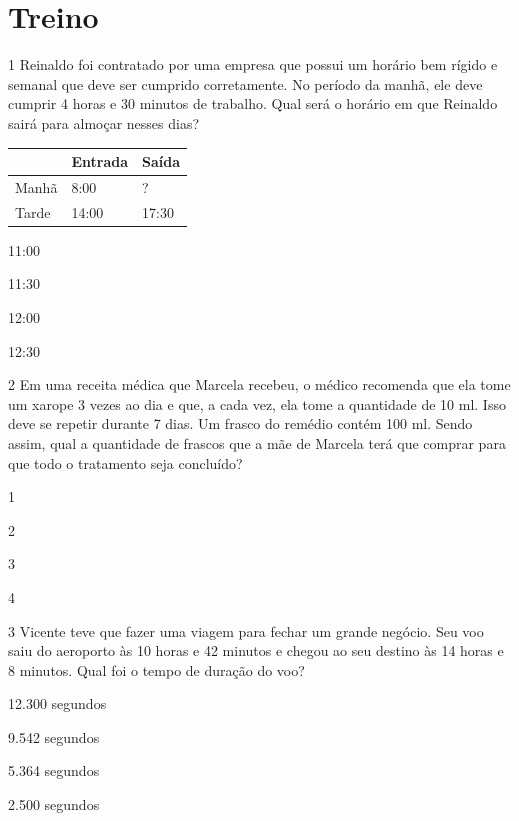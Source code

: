 \section*{Treino}

\num{1} Reinaldo foi contratado por uma empresa que possui um horário bem
rígido e semanal que deve ser cumprido corretamente. No período da manhã,
ele deve cumprir 4 horas e 30 minutos de trabalho. Qual será o horário em que
Reinaldo sairá para almoçar nesses dias?

\begin{longtable}[]{@{}lll@{}}
\toprule
& Entrada & Saída\tabularnewline
\midrule
\endhead
Manhã & 8:00 & ?\tabularnewline
Tarde & 14:00 & 17:30\tabularnewline
\bottomrule
\end{longtable}

\begin{minipage}{.5\textwidth}
\begin{escolha}
\item
  11:00
\item
  11:30
\item
  12:00
\item
  12:30
\end{escolha}
\end{minipage}


\num{2} Em uma receita médica que Marcela recebeu, o médico recomenda que ela tome um xarope 3
vezes ao dia e que, a cada vez, ela tome a quantidade de 10 ml. Isso deve se repetir durante 7
dias. Um frasco do remédio contém 100 ml. Sendo assim, qual a quantidade
de frascos que a mãe de Marcela terá que comprar para que todo o
tratamento seja concluído?

\begin{minipage}{.5\textwidth}
\begin{escolha}
\item
  1
\item
  2
\item
  3
\item
  4
\end{escolha}
\end{minipage}


\num{3} Vicente teve que fazer uma viagem para fechar um grande negócio. Seu
voo saiu do aeroporto às 10 horas e 42 minutos e chegou ao seu destino
às 14 horas e 8 minutos. Qual foi o tempo de duração do voo?

\begin{minipage}{.5\textwidth}
\begin{escolha}
\item
  12.300 segundos
\item
  9.542 segundos
\item
  5.364 segundos
\item
  2.500 segundos
\end{escolha}
\end{minipage}



